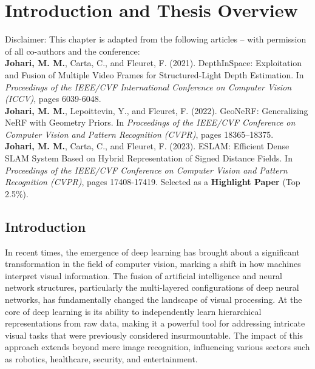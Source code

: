 \chapter{Introduction and Thesis Overview}

\begin{tcolorbox}[colback=gray!20, boxrule=1pt, colframe=black]
  Disclaimer: This chapter is adapted from the following articles – with permission of all co-authors and the conference: \\

    \textbf{Johari, M. M.}, Carta, C., and Fleuret, F. (2021). DepthInSpace: Exploitation and Fusion of Multiple Video Frames for Structured-Light Depth Estimation. In \textit{Proceedings of the IEEE/CVF International Conference on Computer Vision (ICCV)}, pages 6039-6048. \\

    \textbf{Johari, M. M.}, Lepoittevin, Y., and Fleuret, F. (2022). GeoNeRF: Generalizing NeRF with Geometry Priors. In \textit{Proceedings of the IEEE/CVF Conference on Computer Vision and Pattern Recognition (CVPR)}, pages 18365–18375. \\

    \textbf{Johari, M. M.}, Carta, C., and Fleuret, F. (2023). ESLAM: Efficient Dense SLAM System Based on Hybrid Representation of Signed Distance Fields. In \textit{Proceedings of the IEEE/CVF Conference on Computer Vision and Pattern Recognition (CVPR)}, pages 17408-17419. Selected as a \textbf{Highlight Paper} (Top 2.5\%).
    
\end{tcolorbox}

\section{Introduction}

In recent times, the emergence of deep learning has brought about a significant transformation in the field of computer vision, marking a shift in how machines interpret visual information. The fusion of artificial intelligence and neural network structures, particularly the multi-layered configurations of deep neural networks, has fundamentally changed the landscape of visual processing. At the core of deep learning is its ability to independently learn hierarchical representations from raw data, making it a powerful tool for addressing intricate visual tasks that were previously considered insurmountable. The impact of this approach extends beyond mere image recognition, influencing various sectors such as robotics, healthcare, security, and entertainment.

